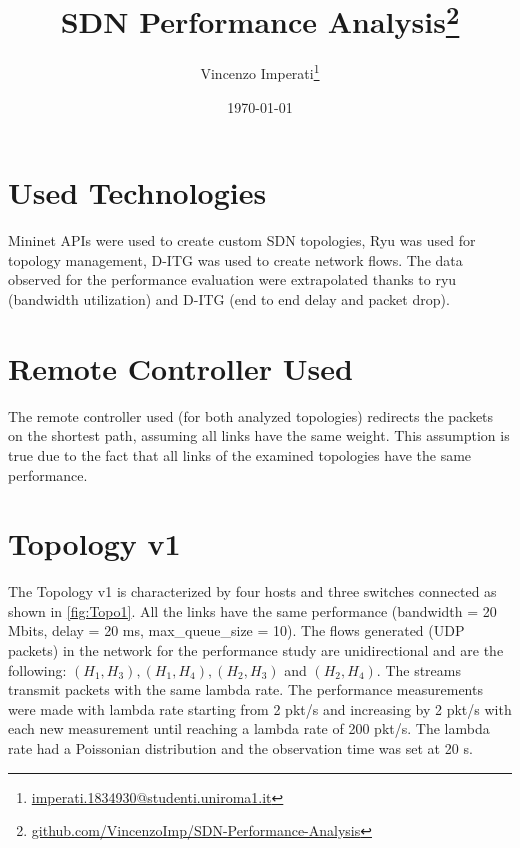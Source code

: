 \documentclass{article}
\title{SDN Performance Analysis\footnote{\href{github.com/VincenzoImp/SDN-Performance-Analysis}{github.com/VincenzoImp/SDN-Performance-Analysis}}}
\author{Vincenzo Imperati\footnote{\href{mailto:imperati.1834930@studenti.uniroma1.it}{imperati.1834930@studenti.uniroma1.it}}}
\date{\today}
\begin{document}
\maketitle
\newpage
\tableofcontents
\newpage

\section{Used Technologies}
Mininet APIs\cite{Mininet} were used to create custom SDN topologies, Ryu\cite{Ryu} was used for topology management, D-ITG\cite{D-ITG} was used to create network flows. The data observed for the performance evaluation were extrapolated thanks to ryu (bandwidth utilization) and D-ITG (end to end delay and packet drop).

\section{Remote Controller Used}
The remote controller used (for both analyzed topologies) redirects the packets on the shortest path, assuming all links have the same weight. This assumption is true due to the fact that all links of the examined topologies have the same performance.

\section{Topology v1}
The Topology v1 is characterized by four hosts and three switches connected as shown in \autoref{fig:Topo1}. All the links have the same performance (bandwidth = 20 Mbits, delay = 20 ms, max\_queue\_size = 10). The flows generated (UDP packets) in the network for the performance study are unidirectional and are the following: $(H_1, H_3), (H_1, H_4), (H_2, H_3)$ and $(H_2, H_4)$. The streams transmit packets with the same lambda rate. The performance measurements were made with lambda rate starting from 2 pkt/s and increasing by 2 pkt/s with each new measurement until reaching a lambda rate of 200 pkt/s. The lambda rate had a Poissonian distribution and the observation time was set at 20 s.
\end{document}
